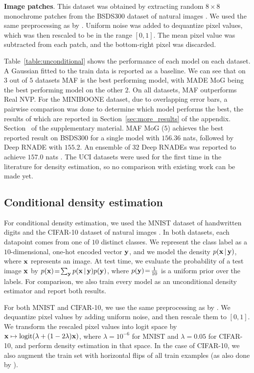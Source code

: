 \textbf{Image patches}. This dataset was obtained by extracting random $8\!\times\! 8$ monochrome patches from the BSDS300 dataset of natural images \citep{Martin:2001}. We used the same preprocessing as by \citet{Uria:2013}. Uniform noise was added to dequantize pixel values, which was then rescaled to be in the range $\left[0, 1\right]$. The mean pixel value was subtracted from each patch, and the bottom-right pixel was discarded.

Table~\ref{table:unconditional} shows the performance of each model on each dataset. A Gaussian fitted to the train data is reported as a baseline. We can see that on $3$ out of $5$ datasets MAF is the best performing model, with MADE MoG being the best performing model on the other $2$. On all datasets, MAF outperforms Real NVP\@. For the MINIBOONE dataset, due to overlapping error bars, a pairwise comparison was done to determine which model performs the best, the results of which are reported in 
\ifarxiv
Section~\ref{sec:more_results} of the appendix.
\else
Section~ of the supplementary material.
\fi
MAF MoG ($5$) achieves the best reported result on BSDS300 for a single model with $156.36$ nats, followed by Deep RNADE \citep{Uria:2014} with $155.2$. An ensemble of $32$ Deep RNADEs was reported to achieve $157.0$ nats \citep{Uria:2014}. The UCI datasets were used for the first time in the literature for density estimation, so no comparison with existing work can be made yet.

\subsection{Conditional density estimation}

For conditional density estimation, we used the MNIST dataset of handwritten digits \citep{LeCun:mnist} and the CIFAR-10 dataset of natural images \citep{Krizhevsky:2009}. In both datasets, each datapoint comes from one of $10$ distinct classes. We represent the class label as a $10$-dimensional, one-hot encoded vector $\mathbf{y}$, and we model the density $p\mathopen{}\left(\mathbf{x}\,|\,\mathbf{y}\right)\mathclose{}$, where $\mathbf{x}$ represents an image. At test time, we evaluate the probability of a test image $\mathbf{x}$ by $p\mathopen{}\left(\mathbf{x}\right)\mathclose{} \!=\! \sum_{\mathbf{y}}{p\mathopen{}\left(\mathbf{x}\,|\,\mathbf{y}\right)\mathclose{}p\mathopen{}\left(\mathbf{y}\right)\mathclose{}}$, where $p\mathopen{}\left(\mathbf{y}\right)\mathclose{}\!=\!\frac{1}{10}$ is a uniform prior over the labels. For comparison, we also train every model as an unconditional density estimator and report both results.

For both MNIST and CIFAR-10, we use the same preprocessing as by \citet{Dinh:2017}. We dequantize pixel values by adding uniform noise, and then rescale them to $\left[0, 1\right]$. We transform the rescaled pixel values into logit space by $\mathbf{x}\mapsto\operatorname{logit}\mathopen{}\left(\lambda + \mathopen{}\left(1-2\lambda\right)\mathclose{} \mathbf{x}\right)\mathclose{}$, where $\lambda\!=\!10^{-6}$ for MNIST and $\lambda\!=\!0.05$ for CIFAR-10, and perform density estimation in that space. In the case of CIFAR-10, we also augment the train set with horizontal flips of all train examples (as also done by \citet{Dinh:2017}).


